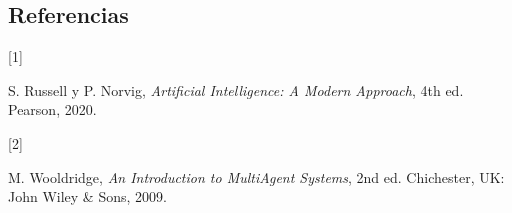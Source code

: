 \documentclass[
  spanish,
  spanish,
  es-tabla,
  twocolumn]{llncs}
\newlength{\cslhangindent}
\newlength{\csllabelwidth}
\newenvironment{CSLReferences}[2] %
 {\begin{list}{}{%
  \setlength{\itemindent}{0pt}
  \setlength{\leftmargin}{0pt}
  \setlength{\parsep}{0pt}
  \ifodd #1
   \setlength{\leftmargin}{\cslhangindent}
   \setlength{\itemindent}{-1\cslhangindent}
  \fi
  \setlength{\itemsep}{#2\baselineskip}}}
 {\end{list}}
\newcommand{\CSLLeftMargin}[1]{\parbox[t]{\csllabelwidth}{\strut#1\strut}}
\newcommand{\CSLRightInline}[1]{\parbox[t]{\linewidth - \csllabelwidth}{\strut#1\strut}}
\begin{document}
\subsection{Referencias}\label{referencias}

\protect{}\label{refs}
\begin{CSLReferences}{0}{0}
\CSLLeftMargin{{[}1{]} }%
\CSLRightInline{S. Russell y P. Norvig, \emph{Artificial Intelligence: A
Modern Approach}, 4th ed. Pearson, 2020.}

\CSLLeftMargin{{[}2{]} }%
\CSLRightInline{M. Wooldridge, \emph{An Introduction to MultiAgent
Systems}, 2nd ed. Chichester, UK: John Wiley \& Sons, 2009.}

\end{CSLReferences}
\end{document}
